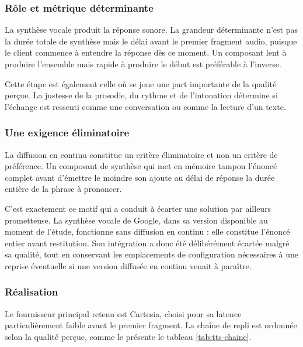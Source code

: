 \subsubsection{Rôle et métrique déterminante}

La synthèse vocale produit la réponse sonore. La grandeur déterminante n'est pas la durée totale de synthèse mais le délai avant le premier fragment audio, puisque le client commence à entendre la réponse dès ce moment. Un composant lent à produire l'ensemble mais rapide à produire le début est préférable à l'inverse.

Cette étape est également celle où se joue une part importante de la qualité perçue. La justesse de la prosodie, du rythme et de l'intonation détermine si l'échange est ressenti comme une conversation ou comme la lecture d'un texte.

\subsubsection{Une exigence éliminatoire}

La diffusion en continu constitue un critère éliminatoire et non un critère de préférence. Un composant de synthèse qui met en mémoire tampon l'énoncé complet avant d'émettre le moindre son ajoute au délai de réponse la durée entière de la phrase à prononcer.

C'est exactement ce motif qui a conduit à écarter une solution par ailleurs prometteuse. La synthèse vocale de Google, dans sa version disponible au moment de l'étude, fonctionne sans diffusion en continu : elle constitue l'énoncé entier avant restitution. Son intégration a donc été délibérément écartée malgré sa qualité, tout en conservant les emplacements de configuration nécessaires à une reprise éventuelle si une version diffusée en continu venait à paraître.

\subsubsection{Réalisation}

Le fournisseur principal retenu est Cartesia, choisi pour sa latence particulièrement faible avant le premier fragment. La chaîne de repli est ordonnée selon la qualité perçue, comme le présente le tableau \ref{tab:tts-chaine}.


